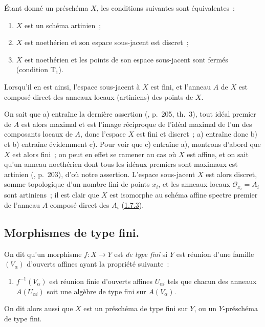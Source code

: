 \begin{proposition}[6.2.2]
\label{I.6.2.2-fr}
Étant donné un préschéma $X$, les conditions suivantes sont équivalentes~:
\begin{enumerate}
  \item[a)] $X$ est un schéma artinien~;
  \item[b)] $X$ est noethérien et son espace sous-jacent est discret~;
  \item[c)] $X$ est noethérien et les points de son espace sous-jacent sont
    fermés (condition $\mathrm{T}_1$).
\end{enumerate}

Lorsqu'il en est ainsi, l'espace sous-jacent à $X$ est fini, et l'anneau $A$
de $X$ est composé direct des anneaux locaux (artiniens) des points de $X$.
\end{proposition}

On sait que a) entraîne la dernière assertion (\cite{I-13}, p.~205, th.~3),
tout idéal premier de $A$ est alors maximal et est l'image réciproque de
l'idéal maximal de l'un des composants locaux de $A$, donc l'espace $X$ est
fini et discret~; a) entraîne donc b) et b) entraîne évidemment c). Pour voir
que c) entraîne a), montrons d'abord que $X$ est alors fini~; on peut en effet
se ramener au cas où $X$ est affine, et on sait qu'un anneau noethérien dont
tous les idéaux premiers sont maximaux est artinien (\cite{I-13}, p.~203),
d'où notre assertion. L'espace sous-jacent $X$ est alors discret, somme
topologique d'un nombre fini de points $x_i$, et les anneaux locaux
$\mathscr{O}_{x_i}=A_i$ sont artiniens~; il est clair que $X$ est isomorphe au
schéma affine spectre premier de l'anneau $A$ composé direct des $A_i$
(\hyperref[I.1.7.3-fr]{1.7.3}).

\subsection{Morphismes de type fini.}
\label{subsection:I.6.3-fr}

\begin{definition}[6.3.1]
\label{I.6.3.1-fr}
On dit qu'un morphisme $f:X\to Y$ est \emph{de type fini} si $Y$ est réunion
d'une famille $(V_\alpha)$ d'ouverts affines ayant la propriété suivante~:
\begin{enumerate}
  \item[(P)] $f^{-1}(V_\alpha)$ est réunion finie d'ouverts affines
    $U_{\alpha i}$ tels que chacun des anneaux $A(U_{\alpha i})$ soit une
    algèbre de type fini sur $A(V_\alpha)$.
\end{enumerate}
On dit alors aussi que $X$ est un préschéma de type fini sur $Y$, ou un
$Y$-préschéma de type fini.
\end{definition}

